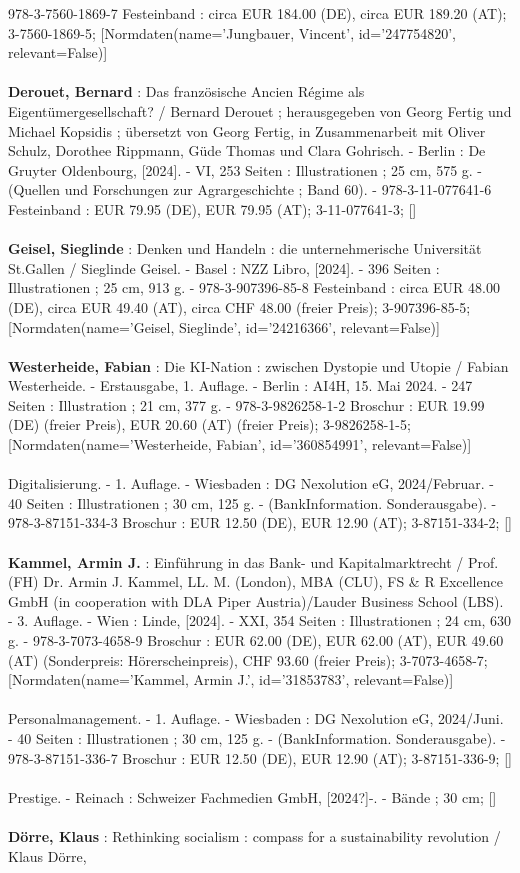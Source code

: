 \documentclass{article}
\begin{document}
\begin{multicols}{3}
978-3-7560-1869-7 Festeinband : circa EUR 184.00 (DE), circa EUR 189.20 (AT); 3-7560-1869-5; [Normdaten(name='Jungbauer, Vincent', id='247754820', relevant=False)]\\\\\textbf{Derouet, Bernard} : Das französische Ancien Régime als Eigentümergesellschaft? / Bernard Derouet ; herausgegeben von Georg Fertig und Michael Kopsidis ; übersetzt von Georg Fertig, in Zusammenarbeit mit Oliver Schulz, Dorothee Rippmann, Güde Thomas und Clara Gohrisch. - Berlin : De Gruyter Oldenbourg, [2024]. - VI, 253 Seiten : Illustrationen ; 25 cm, 575 g. - (Quellen und Forschungen zur Agrargeschichte ; Band 60). - 978-3-11-077641-6 Festeinband : EUR 79.95 (DE), EUR 79.95 (AT); 3-11-077641-3; []\\\\\textbf{Geisel, Sieglinde} : Denken und Handeln : die unternehmerische Universität St.Gallen / Sieglinde Geisel. - Basel : NZZ Libro, [2024]. - 396 Seiten : Illustrationen ; 25 cm, 913 g. - 978-3-907396-85-8 Festeinband : circa EUR 48.00 (DE), circa EUR 49.40 (AT), circa CHF 48.00 (freier Preis); 3-907396-85-5; [Normdaten(name='Geisel, Sieglinde', id='24216366', relevant=False)]\\\\\textbf{Westerheide, Fabian} : Die KI-Nation : zwischen Dystopie und Utopie / Fabian Westerheide. - Erstausgabe, 1. Auflage. - Berlin : AI4H, 15. Mai 2024. - 247 Seiten : Illustration ; 21 cm, 377 g. - 978-3-9826258-1-2 Broschur : EUR 19.99 (DE) (freier Preis), EUR 20.60 (AT) (freier Preis); 3-9826258-1-5; [Normdaten(name='Westerheide, Fabian', id='360854991', relevant=False)]\\\\Digitalisierung. - 1. Auflage. - Wiesbaden : DG Nexolution eG, 2024/Februar. - 40 Seiten : Illustrationen ; 30 cm, 125 g. - (BankInformation. Sonderausgabe). - 978-3-87151-334-3 Broschur : EUR 12.50 (DE), EUR 12.90 (AT); 3-87151-334-2; []\\\\\textbf{Kammel, Armin J.} : Einführung in das Bank- und Kapitalmarktrecht / Prof. (FH) Dr. Armin J. Kammel, LL. M. (London), MBA (CLU), FS \& R Excellence GmbH (in cooperation with DLA Piper Austria)/Lauder Business School (LBS). - 3. Auflage. - Wien : Linde, [2024]. - XXI, 354 Seiten : Illustrationen ; 24 cm, 630 g. - 978-3-7073-4658-9 Broschur : EUR 62.00 (DE), EUR 62.00 (AT), EUR 49.60 (AT) (Sonderpreis: Hörerscheinpreis), CHF 93.60 (freier Preis); 3-7073-4658-7; [Normdaten(name='Kammel, Armin J.', id='31853783', relevant=False)]\\\\Personalmanagement. - 1. Auflage. - Wiesbaden : DG Nexolution eG, 2024/Juni. - 40 Seiten : Illustrationen ; 30 cm, 125 g. - (BankInformation. Sonderausgabe). - 978-3-87151-336-7 Broschur : EUR 12.50 (DE), EUR 12.90 (AT); 3-87151-336-9; []\\\\Prestige. - Reinach : Schweizer Fachmedien GmbH, [2024?]-. - Bände ; 30 cm; []\\\\\textbf{Dörre, Klaus} : Rethinking socialism : compass for a sustainability revolution / Klaus Dörre, 
\end{multicols}
\end{document}

